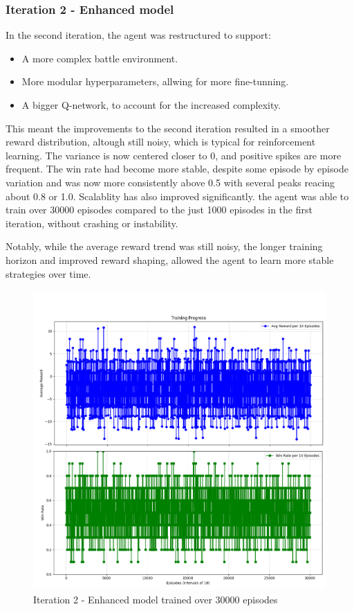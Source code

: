 \subsubsection{Iteration 2 - Enhanced model}
In the second iteration, the agent was restructured to support:
\begin{itemize}
    \item A more complex battle environment.
    \item More modular hyperparameters, allwing for more fine-tunning.
    \item A bigger Q-network, to account for the increased complexity.
\end{itemize}
This meant the improvements to the second iteration resulted in a smoother reward
distribution, altough still noisy, which is typical for reinforcement learning. The variance
is now centered closer to 0, and positive spikes are more frequent. The win rate
had become more stable, despite some episode by episode variation
and was now more consistently above 0.5 with several peaks reacing about 0.8 or 1.0.
Scalablity has also improved significantly. the agent was able to train over 30000 episodes
compared to the just 1000 episodes in the first iteration, without crashing or instability.

Notably, while the average reward trend was still noisy, the longer training horizon
and improved reward shaping, allowed the agent to learn more stable strategies over time.

\begin{figure}[H]
    \centering
    \includegraphics[width=\textwidth]{assets/Iteration-2-graphs.png}
    \caption{Iteration 2 - Enhanced model trained over 30000 episodes}
    \label{fig:iteration-2-graphs}
\end{figure}

